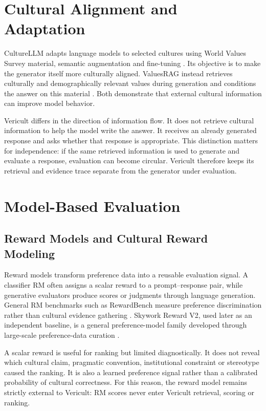 \section{Cultural Alignment and Adaptation}
CultureLLM adapts language models to selected cultures using World Values Survey material, semantic augmentation and fine-tuning \parencite{li2024culturellm}. Its objective is to make the generator itself more culturally aligned. ValuesRAG instead retrieves culturally and demographically relevant values during generation and conditions the answer on this material \parencite{seo2025valuesrag}. Both demonstrate that external cultural information can improve model behavior.

Vericult differs in the direction of information flow. It does not retrieve cultural information to help the model write the answer. It receives an already generated response and asks whether that response is appropriate. This distinction matters for independence: if the same retrieved information is used to generate and evaluate a response, evaluation can become circular. Vericult therefore keeps its retrieval and evidence trace separate from the generator under evaluation.

\section{Model-Based Evaluation}

\subsection{Reward Models and Cultural Reward Modeling}
Reward models transform preference data into a reusable evaluation signal. A classifier RM often assigns a scalar reward to a prompt--response pair, while generative evaluators produce scores or judgments through language generation. General RM benchmarks such as RewardBench measure preference discrimination rather than cultural evidence gathering \parencite{lambert2025rewardbench}. Skywork Reward V2, used later as an independent baseline, is a general preference-model family developed through large-scale preference-data curation \parencite{liu2026skyworkrewardv2}.

A scalar reward is useful for ranking but limited diagnostically. It does not reveal which cultural claim, pragmatic convention, institutional constraint or stereotype caused the ranking. It is also a learned preference signal rather than a calibrated probability of cultural correctness. For this reason, the reward model remains strictly external to Vericult: RM scores never enter Vericult retrieval, scoring or ranking.

